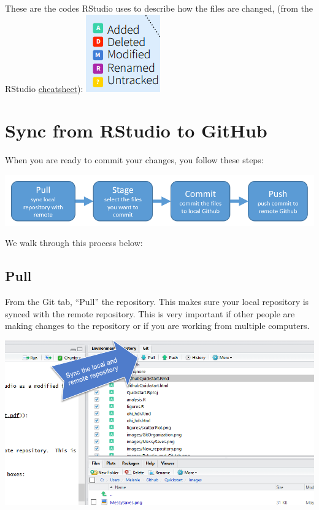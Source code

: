 \documentclass[]{book}
\begin{document}
These are the codes RStudio uses to describe how the files are changed, (from the RStudio \href{http://www.rstudio.com/wp-content/uploads/2016/01/rstudio-IDE-cheatsheet.pdf}{cheatsheet}):
\includegraphics{img/modified.png}

\hypertarget{sync-from-rstudio-to-github}{%
\section{Sync from RStudio to GitHub}\label{sync-from-rstudio-to-github}}

When you are ready to commit your changes, you follow these steps:

\includegraphics{img/commit_overview.png}

We walk through this process below:

\hypertarget{pull}{%
\subsection{Pull}\label{pull}}

From the Git tab, ``Pull'' the repository. This makes sure your local repository is synced with the remote repository. This is very important if other people are making changes to the repository or if you are working from multiple computers.

\includegraphics{img/pull.png}
\end{document}
